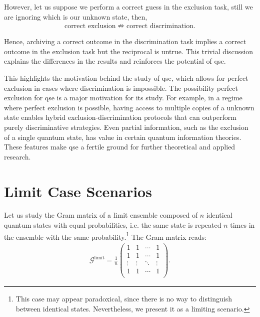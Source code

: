 \documentclass[12pt,letterpaper]{article}
\begin{document}
However, let us suppose we perform a correct guess in the exclusion task, still we are ignoring which is our unknown state, then,
\begin{align*}
	\text{correct exclusion}\nRightarrow\text{correct discrimination}.
\end{align*}

Hence, archiving a correct outcome in the discrimination task implies a correct outcome in the exclusion task but the reciprocal is untrue. This trivial discussion explains the differences in the results and reinforces the potential of \gls{qse}.

This highlights the motivation behind the study of \gls{qse}, which allows for perfect exclusion in cases where discrimination is impossible. The possibility perfect exclusion for \gls{qse} is a major motivation for its study. For example, in a regime where perfect exclusion is possible, having access to multiple copies of a unknown state enables hybrid exclusion-discrimination protocols that can outperform purely discriminative strategies. Even partial information, such as the exclusion of a single quantum state, has value in certain quantum information theories. These features make \gls{qse} a fertile ground for further theoretical and applied research.

\section{Limit Case Scenarios}\label{sectionLimitCaseScenarios}

\hspace{20pt}Let us study the Gram matrix of a limit ensemble composed of $n$ identical quantum states with equal probabilities, i.e. the same state is repeated $n$ times in the ensemble with the same probability.\footnote{This case may appear paradoxical, since there is no way to distinguish between identical states. Nevertheless, we present it as a limiting scenario.} The Gram matrix reads:
\begin{align*}
	\mathcal{G}^{\text{limit}} = \frac{1}{n}\begin{pmatrix}
 1 & 1 & \cdots & 1 \\
 1 & 1 & \cdots & 1 \\
 \vdots & \vdots & \ddots & \vdots \\
 1 & 1 & \cdots & 1 \\
\end{pmatrix}.
\end{align*}
\end{document}
